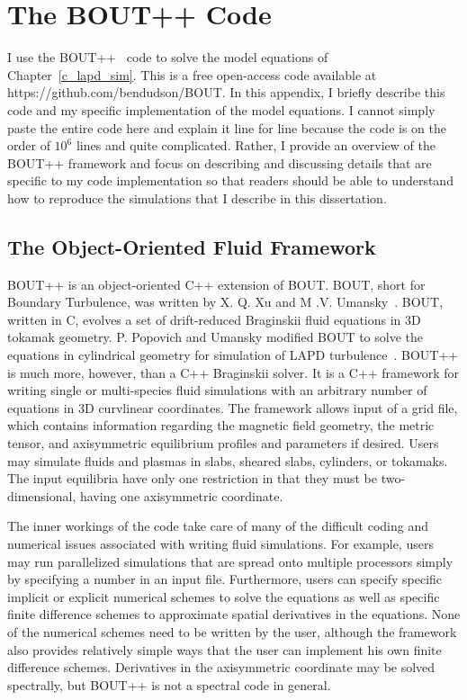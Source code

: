 \chapter{The BOUT++ Code}
\label{app_bout}

I use the BOUT++~\cite{dudson2009} code to solve the model equations of Chapter~\ref{c_lapd_sim}. This is a free open-access code available at https://github.com/bendudson/BOUT.
In this appendix, I briefly describe this code and my specific implementation of the model equations.
I cannot simply paste the entire code here and explain it line for line because the code is on the order of $10^6$ lines and quite complicated. Rather, I provide an overview of the BOUT++ framework
and focus on describing and discussing details that are specific to my code implementation so that readers should be able to understand how to reproduce the simulations that I describe in this
dissertation.

\section{The Object-Oriented Fluid Framework}
\label{s_obj_oriented}

BOUT++ is an object-oriented C++ extension of BOUT. BOUT, short for Boundary Turbulence, was written by X. Q. Xu and M .V. Umansky~\cite{xu1998,umansky2009}. BOUT, written in C, evolves
a set of drift-reduced Braginskii fluid equations in 3D tokamak geometry. P. Popovich and Umansky modified BOUT to solve the equations in cylindrical geometry for simulation of
LAPD turbulence~\cite{popovich2010b}. BOUT++ is much more, however, than a C++ Braginskii solver.
It is a C++ framework for writing single or multi-species fluid simulations with an arbitrary number of equations in 3D curvlinear coordinates. The framework allows input of a grid file,
which contains information regarding the magnetic field geometry, the metric tensor, and axisymmetric equilibrium profiles and parameters if desired. Users may simulate fluids and plasmas
in slabs, sheared slabs, cylinders, or tokamaks. The input equilibria have only one restriction in that they must be two-dimensional, having one axisymmetric coordinate.

The inner workings of the code take care of many of the difficult coding and numerical issues associated with writing
fluid simulations. For example, users may run parallelized simulations that are spread onto multiple processors simply by specifying a number in an input file. Furthermore, users can specify
specific implicit or explicit numerical schemes to solve the equations as well as specific finite difference schemes to approximate spatial derivatives in the equations. 
None of the numerical schemes need to be written by the user, although the framework also provides relatively simple ways that the user can implement his own finite difference schemes. 
Derivatives in the axisymmetric coordinate may be solved spectrally, but BOUT++ is not a spectral code in general.

